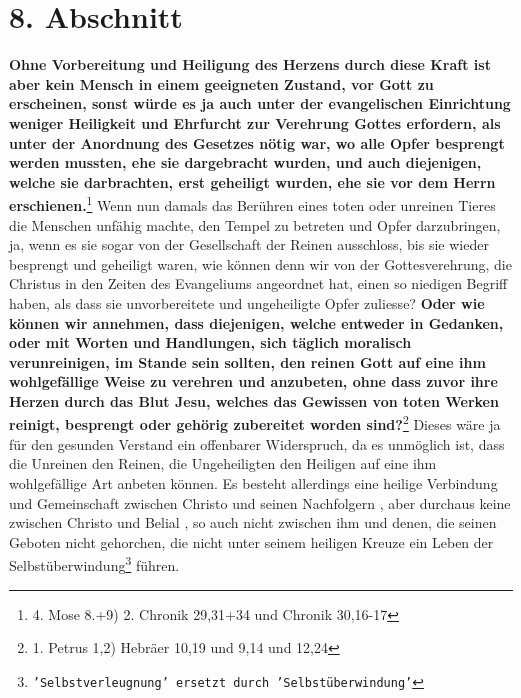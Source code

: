 \section{8. Abschnitt} \label{kap6_ab8}

\textbf{Ohne Vorbereitung und Heiligung des Herzens
durch diese Kraft ist aber kein
Mensch in einem geeigneten Zustand, vor Gott zu erscheinen, sonst würde es ja
auch unter der evangelischen Einrichtung weniger Heiligkeit und Ehrfurcht zur
Verehrung Gottes erfordern, als unter der Anordnung des Gesetzes nötig war, wo
alle Opfer besprengt werden mussten, ehe sie dargebracht wurden, und auch
diejenigen, welche sie darbrachten, erst geheiligt wurden, ehe sie vor dem
Herrn erschienen.}\footnote{4. Mose 8.+9) 2. Chronik 29,31+34 und Chronik
30,16-17}
Wenn nun damals das Berühren eines toten oder unreinen Tieres die Menschen
unfähig machte, den Tempel zu betreten und Opfer darzubringen, ja, wenn es sie
sogar von der Gesellschaft der Reinen ausschloss, bis sie wieder besprengt und
geheiligt waren, wie können denn wir von der Gottesverehrung, die Christus in
den Zeiten des Evangeliums angeordnet hat, einen so niedigen Begriff haben, als
dass sie unvorbereitete und ungeheiligte Opfer zuliesse?
\label{ref:06_08_moralisch_verunreinigt} \textbf{Oder wie können wir
annehmen, dass diejenigen, welche entweder in Gedanken, oder mit Worten und
Handlungen, sich täglich moralisch verunreinigen, im Stande sein sollten, den
reinen Gott auf eine ihm wohlgefällige Weise zu verehren und anzubeten, ohne
dass zuvor ihre Herzen durch das Blut Jesu, welches das Gewissen von toten
Werken  reinigt, besprengt oder gehörig zubereitet worden
sind?}\footnote{1. Petrus 1,2) Hebräer 10,19 und 9,14 und 12,24}
Dieses wäre ja für den gesunden Verstand ein
offenbarer Widerspruch, da es unmöglich ist, dass die Unreinen den Reinen, die
Ungeheiligten den Heiligen   auf eine ihm
wohlgefällige Art anbeten können. Es
besteht allerdings eine heilige Verbindung und Gemeinschaft
zwischen Christo
und seinen Nachfolgern , aber durchaus keine
zwischen
Christo
und Belial , so
auch nicht zwischen ihm und denen, die seinen Geboten nicht gehorchen, die nicht
unter seinem heiligen Kreuze ein Leben der
Selbstüberwindung\footnote{\texttt{'Selbstverleugnung' ersetzt durch
'Selbstüberwindung'}} führen.

